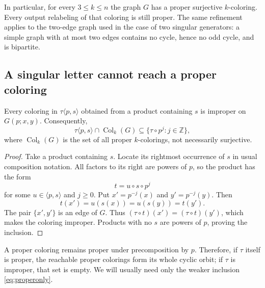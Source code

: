 \documentclass[11pt,a4paper]{article}
\numberwithin{equation}{section}
\theoremstyle{definition}
\theoremstyle{remark}
\newcommand{\Z}{\mathbb Z}
\begin{document}
In particular, for every $3\le k\le n$ the graph $G$ has a proper surjective
$k$-coloring. Every output relabeling of that coloring is still proper.
The same refinement applies to the two-edge graph used in the case of two
singular generators: a simple graph with at most two edges contains no cycle,
hence no odd cycle, and is bipartite.

\subsection{A singular letter cannot reach a proper coloring}

\begin{lemma}\label{lem:rightmost}
Every coloring in $\tau\langle p,s\rangle$ obtained from a product containing
$s$ is improper on $G(p;x,y)$. Consequently,
\begin{equation}\label{eq:properonly}
 \tau\langle p,s\rangle\cap\operatorname{Col}_k(G)
 \subseteq\{\tau\circ p^j:j\in\Z\},
\end{equation}
where $\operatorname{Col}_k(G)$ is the set of all proper $k$-colorings,
not necessarily surjective.
\end{lemma}
\begin{proof}
Take a product containing $s$. Locate its rightmost occurrence of $s$ in
usual composition notation. All factors to its right are powers of $p$, so
the product has the form
\[
 t=u\circ s\circ p^j
\]
for some $u\in\langle p,s\rangle$ and $j\ge0$. Put
$x'=p^{-j}(x)$ and $y'=p^{-j}(y)$. Then
\[
 t(x')=u(s(x))=u(s(y))=t(y').
\]
The pair $\{x',y'\}$ is an edge of $G$. Thus
$(\tau\circ t)(x')=(\tau\circ t)(y')$, which makes the coloring improper.
Products with no $s$ are powers of $p$, proving the inclusion.
\end{proof}

A proper coloring remains proper under precomposition by $p$. Therefore, if
$\tau$ itself is proper, the reachable proper colorings form its whole cyclic
orbit; if $\tau$ is improper, that set is empty. We will usually need only
the weaker inclusion \eqref{eq:properonly}.
\end{document}
